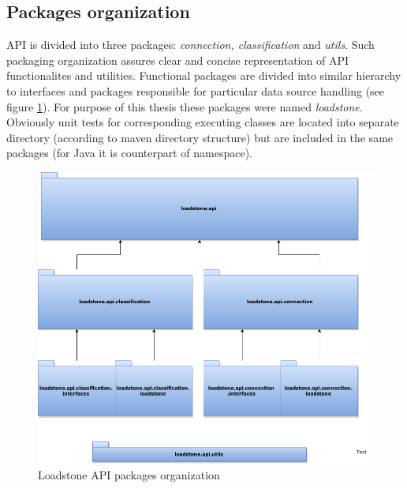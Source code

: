 \subsection{Packages organization}
API is divided into three packages: \textit{connection, classification} and \textit{utils}. Such packaging organization assures clear and concise representation of API functionalites and utilities. Functional packages are divided into similar hierarchy to interfaces and packages responsible for particular data source handling (see figure \ref{fig:@=packages_oragnization}). For purpose of this thesis these packages were named \textit{loadstone}. Obviously unit tests for corresponding executing classes are located into separate directory (according to maven directory structure) \cite{20} but are included in the same packages (for Java it is counterpart of namespace).
\begin{figure}[h]
	\centering
	\includegraphics[scale=0.5]{loadstone_api_packages.png}
	\caption{Loadstone API packages organization}
	\label{fig:@=packages_oragnization}
\end{figure}
